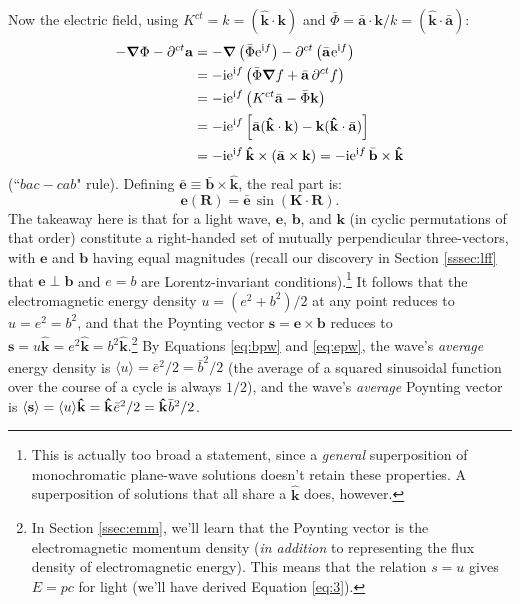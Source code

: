 \documentclass[12pt]{article}
\renewcommand{\vv}[1]{\mathbf{#1}}
\newcommand{\del}{\boldsymbol{\nabla}}
\begin{document}
Now the electric field, using $K^{ct} = k = (\vv{\hat{k}} \cdot \vv k)$ and $\bar{\Phi} = \bar{\vv a} \cdot \vv k / k = (\vv{\hat{k}} \cdot \bar{\vv a} )$:
\begin{equation*}
\begin{aligned}
- \del \Phi - \partial^{ct} \vv a &= - \del \left( \bar{\Phi} \mathrm{e}^{\mathrm{i} f} \right) - \partial^{ct} \left( \bar{\vv a} \mkern1mu \mathrm{e}^{\mathrm{i} f} \right) \\
&= - \mathrm{i} \mathrm{e}^{\mathrm{i} f} \left( \bar{\Phi} \del f + \bar{\vv a} \, \partial^{ct} f \right) \\
&= - \mathrm{i} \mathrm{e}^{\mathrm{i} f} \left( K^{ct} \bar{\vv a} - \bar{\Phi} \vv k \right) \\[1pt]
&= - \mathrm{i} \mathrm{e}^{\mathrm{i} f} \left[ \bar{\vv a} (\vv{\hat{k}} \cdot \vv k )  - \vv k (\vv{\hat{k}} \cdot \bar{\vv a} ) \right] \\[1pt]
&= - \mathrm{i} \mathrm{e}^{\mathrm{i} f} \, \vv{\hat{k}} \times (\bar{\vv a} \times \vv k) = - \mathrm{i} \mathrm{e}^{\mathrm{i} f} \, \bar{\vv b} \times \vv{\hat{k}}
\end{aligned}
\end{equation*}
(``$bac - cab$" rule). Defining $\bar{\vv e} \equiv \bar{\vv b} \times \vv{\hat{k}}$, the real part is:
\begin{equation}\label{eq:epw}
\vv e (\vv R) = \bar{\vv e} \, \sin \left( \vv K \cdot \vv R \right) .
\end{equation}
The takeaway here is that for a light wave, $\vv e$, $\vv b$, and $\vv k$ (in cyclic permutations of that order) constitute a right-handed set of mutually perpendicular three-vectors, with $\vv e$ and $\vv b$ having equal magnitudes (recall our discovery in Section \ref{sssec:lff} that $\vv e \perp \vv b$ and $e = b$ are Lorentz-invariant conditions).\footnote{This is actually too broad a statement, since a \emph{general} superposition of monochromatic plane-wave solutions doesn't retain these properties. A superposition of solutions that all share a $\vv{\hat{k}}$ does, however.} It follows that the electromagnetic energy density $u = (e^2 + b^2) / 2$ at any point reduces to $u = e^2 = b^2$, and that the Poynting vector $\vv s = \vv e \times \vv b$ reduces to ${\vv s = u \vv{\hat{k}} = e^2 \vv{\hat{k}} = b^2 \vv{\hat{k}}}$.\footnote{\label{fn:epc}In Section \ref{ssec:emm}, we'll learn that the Poynting vector is the electromagnetic momentum density (\emph{in addition} to representing the flux density of electromagnetic energy). This means that the relation $s = u$ gives $E = pc$ for light (we'll have derived Equation \ref{eq:3}).} By Equations \ref{eq:bpw} and \ref{eq:epw}, the wave's \emph{average} energy density is $\langle u \rangle = \bar{e}^2 / 2 = \bar{b}^2 / 2$ (the average of a squared sinusoidal function over the course of a cycle is always $1/2$), and the wave's \emph{average} Poynting vector is $\langle \vv s \rangle = \langle u \rangle \vv{\hat{k}} = \vv{\hat{k}} \mkern1mu \bar{e}^2 / 2 = \vv{\hat{k}} \mkern1mu \bar{b}^2 / 2$.
\end{document}
